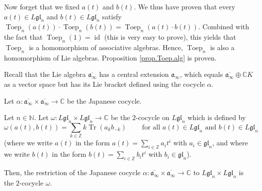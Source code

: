 \documentclass[etingof-lie.tex]{subfiles}
\begin{document}
Now forget that we fixed $a\left(  t\right)  $ and $b\left(  t\right)  $. We
thus have proven that every $a\left(  t\right)  \in L\mathfrak{gl}_{n}$ and
$b\left(  t\right)  \in L\mathfrak{gl}_{n}$ satisfy $\operatorname*{Toep}%
\nolimits_{n}\left(  a\left(  t\right)  \right)  \cdot\operatorname*{Toep}%
\nolimits_{n}\left(  b\left(  t\right)  \right)  =\operatorname*{Toep}%
\nolimits_{n}\left(  a\left(  t\right)  \cdot b\left(  t\right)  \right)  $.
Combined with the fact that $\operatorname*{Toep}\nolimits_{n}\left(
1\right)  =\operatorname*{id}$ (this is very easy to prove), this yields that
$\operatorname*{Toep}\nolimits_{n}$ is a homomorphism of associative algebras.
Hence, $\operatorname*{Toep}\nolimits_{n}$ is also a homomorphism of Lie
algebras. Proposition \ref{prop.Toep.alg} is proven.

Recall that the Lie algebra $\overline{\mathfrak{a}_{\infty}}$ has a central
extension $\mathfrak{a}_{\infty}$, which equals $\overline{\mathfrak{a}%
_{\infty}}\oplus\mathbb{C}K$ as a vector space but has its Lie bracket defined
using the cocycle $\alpha$.

\begin{proposition}
\label{prop.ainf.alphaomega}Let $\alpha:\overline{\mathfrak{a}_{\infty}}%
\times\overline{\mathfrak{a}_{\infty}}\rightarrow\mathbb{C}$ be the Japanese cocycle.

Let $n\in\mathbb{N}$. Let $\omega:L\mathfrak{gl}_{n}\times L\mathfrak{gl}%
_{n}\rightarrow\mathbb{C}$ be the $2$-cocycle on $L\mathfrak{gl}_{n}$ which is
defined by%
\begin{equation}
\omega\left(  a\left(  t\right)  ,b\left(  t\right)  \right)  =\sum
\limits_{k\in\mathbb{Z}}k\operatorname*{Tr}\left(  a_{k}b_{-k}\right)
\ \ \ \ \ \ \ \ \ \ \text{for all }a\left(  t\right)  \in L\mathfrak{gl}%
_{n}\text{ and }b\left(  t\right)  \in L\mathfrak{gl}_{n}
\label{prop.ainf.alphaomega.form}%
\end{equation}
(where we write $a\left(  t\right)  $ in the form $a\left(  t\right)
=\sum\limits_{i\in\mathbb{Z}}a_{i}t^{i}$ with $a_{i}\in\mathfrak{gl}_{n}$, and
where we write $b\left(  t\right)  $ in the form $b\left(  t\right)
=\sum\limits_{i\in\mathbb{Z}}b_{i}t^{i}$ with $b_{i}\in\mathfrak{gl}_{n}$).

Then, the restriction of the Japanese cocycle $\alpha:\overline{\mathfrak{a}%
_{\infty}}\times\overline{\mathfrak{a}_{\infty}}\rightarrow\mathbb{C}$ to
$L\mathfrak{gl}_{n}\times L\mathfrak{gl}_{n}$ is the $2$-cocycle $\omega$.
\end{proposition}
\end{document}
